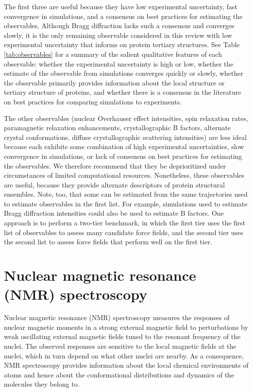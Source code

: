 \documentclass[9pt,review]{livecoms}
\begin{document}
The first three are useful because they have low experimental uncertainty, fast convergence in simulations, and a consensus on best practices for estimating the observables.
Although Bragg diffraction lacks such a consensus and converges slowly, it is the only remaining observable considered in this review with low experimental uncertainty that informs on protein tertiary structures.
See Table \ref{tab:observables} for a summary of the salient qualitative features of each observable: whether the experimental uncertainty is high or low, whether the estimate of the observable from simulations converges quickly or slowly, whether the observable primarily provides information about the local structure or tertiary structure of proteins, and whether there is a consensus in the literature on best practices for comparing simulations to experiments.

The other observables (nuclear Overhauser effect intensities, spin relaxation rates, paramagnetic relaxation enhancements, crystallographic B factors, alternate crystal conformations, diffuse crystallographic scattering intensities) are less ideal because each exhibits some combination of high experimental uncertainties, slow convergence in simulations, or lack of consensus on best practices for estimating the observables.
We therefore recommend that they be deprioritized under circumstances of limited computational resources.
Nonetheless, these observables are useful, because they provide alternate descriptors of protein structural ensembles.
Note, too, that some can be estimated from the same trajectories used to estimate observables in the first list.
For example, simulations used to estimate Bragg diffraction intensities could also be used to estimate B factors.
One approach is to perform a two-tier benchmark, in which the first tier uses the first list of observables to assess many candidate force fields, and the second tier uses the second list to assess force fields that perform well on the first tier.

\section{Nuclear magnetic resonance (NMR) spectroscopy}
\label{sec:nmr}

Nuclear magnetic resonance (NMR) spectroscopy measures the responses of nuclear magnetic moments in a strong external magnetic field to perturbations by weak oscillating external magnetic fields tuned to the resonant frequency of the nuclei.
The observed responses are sensitive to the local magnetic fields at the nuclei, which in turn depend on what other nuclei are nearby.
As a consequence, NMR spectroscopy provides information about the local chemical environments of atoms and hence about the conformational distributions and dynamics of the molecules they belong to.
\end{document}
